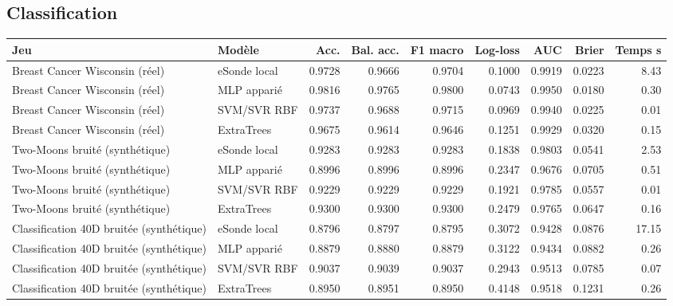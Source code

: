 \documentclass[11pt,a4paper]{article}
\begin{document}
\subsection{Classification}
\begin{longtable}{p{2.45cm}p{1.55cm}r r r r r r r}
\toprule Jeu & Modèle & Acc. & Bal. acc. & F1 macro & Log-loss & AUC & Brier & Temps s\\\midrule\endhead
Breast Cancer Wisconsin (réel) & eSonde local & 0.9728 & 0.9666 & 0.9704 & 0.1000 & 0.9919 & 0.0223 & 8.43 \\
Breast Cancer Wisconsin (réel) & MLP apparié & 0.9816 & 0.9765 & 0.9800 & 0.0743 & 0.9950 & 0.0180 & 0.30 \\
Breast Cancer Wisconsin (réel) & SVM/SVR RBF & 0.9737 & 0.9688 & 0.9715 & 0.0969 & 0.9940 & 0.0225 & 0.01 \\
Breast Cancer Wisconsin (réel) & ExtraTrees & 0.9675 & 0.9614 & 0.9646 & 0.1251 & 0.9929 & 0.0320 & 0.15 \\
Two-Moons bruité (synthétique) & eSonde local & 0.9283 & 0.9283 & 0.9283 & 0.1838 & 0.9803 & 0.0541 & 2.53 \\
Two-Moons bruité (synthétique) & MLP apparié & 0.8996 & 0.8996 & 0.8996 & 0.2347 & 0.9676 & 0.0705 & 0.51 \\
Two-Moons bruité (synthétique) & SVM/SVR RBF & 0.9229 & 0.9229 & 0.9229 & 0.1921 & 0.9785 & 0.0557 & 0.01 \\
Two-Moons bruité (synthétique) & ExtraTrees & 0.9300 & 0.9300 & 0.9300 & 0.2479 & 0.9765 & 0.0647 & 0.16 \\
Classification 40D bruitée (synthétique) & eSonde local & 0.8796 & 0.8797 & 0.8795 & 0.3072 & 0.9428 & 0.0876 & 17.15 \\
Classification 40D bruitée (synthétique) & MLP apparié & 0.8879 & 0.8880 & 0.8879 & 0.3122 & 0.9434 & 0.0882 & 0.26 \\
Classification 40D bruitée (synthétique) & SVM/SVR RBF & 0.9037 & 0.9039 & 0.9037 & 0.2943 & 0.9513 & 0.0785 & 0.07 \\
Classification 40D bruitée (synthétique) & ExtraTrees & 0.8950 & 0.8951 & 0.8950 & 0.4148 & 0.9518 & 0.1231 & 0.26 \\
\bottomrule\end{longtable}
\end{document}

